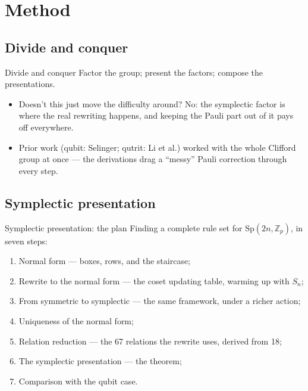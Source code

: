 \documentclass[aspectratio=169]{beamer}
\begin{document}
\section{Method}

\subsection{Divide and conquer}

\begin{frame}{Divide and conquer}
  Factor the group; present the factors; compose the presentations.
  \vfill
  \begin{center}
  \end{center}
  \vfill
  \begin{itemize}
    \item Doesn't this just move the difficulty around?  \alert{No}: the
          symplectic factor is where the real rewriting happens, and
          keeping the Pauli part out of it pays off everywhere.
    \item Prior work (qubit: Selinger; qutrit: Li et al.) worked with
      the whole Clifford group at once --- the derivations drag a
      ``messy'' Pauli correction through every step.
  \end{itemize}
\end{frame}

\subsection{Symplectic presentation}

\begin{frame}{Symplectic presentation: the plan}
  Finding a complete rule set for $\mathrm{Sp}(2n,\mathbb{Z}_p)$, in
  seven steps:
  \begin{enumerate}
    \item \alert{Normal form} --- boxes, rows, and the staircase;
    \item \alert{Rewrite to the normal form} --- the coset updating
          table, warming up with $S_n$;
    \item \alert{From symmetric to symplectic} --- the same framework,
          under a richer action;
    \item \alert{Uniqueness of the normal form};
    \item \alert{Relation reduction} --- the 67 relations the rewrite
          uses, derived from 18;
    \item \alert{The symplectic presentation} --- the theorem;
    \item \alert{Comparison with the qubit case}.
  \end{enumerate}
\end{frame}
\end{document}
